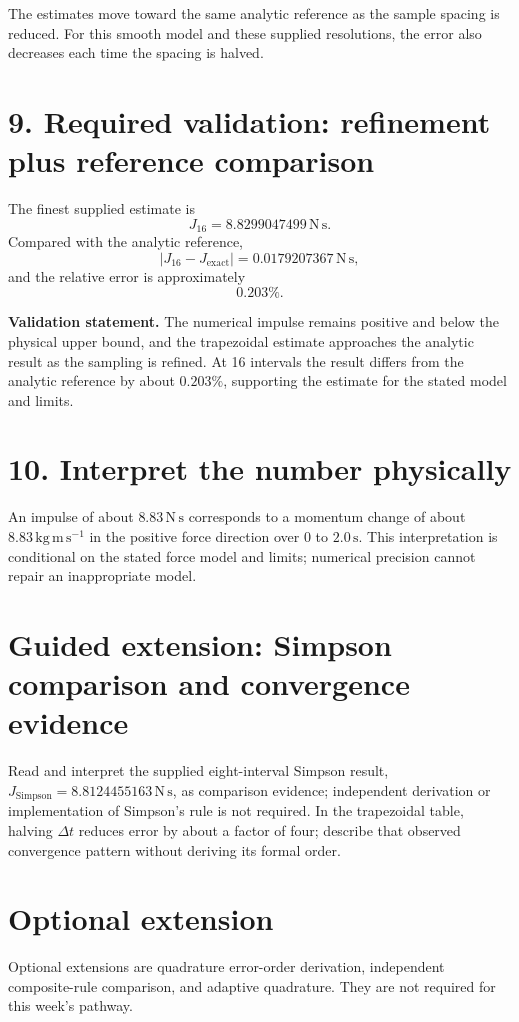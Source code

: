 \documentclass[11pt,a4paper]{article}
\newcommand{\units}[1]{\,\mathrm{#1}}
\begin{document}
The estimates move toward the same analytic reference as the sample spacing is reduced. For this smooth model and these supplied resolutions, the error also decreases each time the spacing is halved.

\section*{9. Required validation: refinement plus reference comparison}
The finest supplied estimate is
\[
J_{16}=8.8299047499\units{N\,s}.
\]
Compared with the analytic reference,
\[
\left|J_{16}-J_{\mathrm{exact}}\right|
=0.0179207367\units{N\,s},
\]
and the relative error is approximately
\[
0.203\%.
\]

\begin{checkbox}\textbf{Validation statement.} The numerical impulse remains positive and below the physical upper bound, and the trapezoidal estimate approaches the analytic result as the sampling is refined. At 16 intervals the result differs from the analytic reference by about $0.203\%$, supporting the estimate for the stated model and limits.\end{checkbox}

\section*{10. Interpret the number physically}
An impulse of about $8.83\units{N\,s}$ corresponds to a momentum change of about $8.83\units{kg\,m\,s^{-1}}$ in the positive force direction over $0$ to $2.0\units{s}$. This interpretation is conditional on the stated force model and limits; numerical precision cannot repair an inappropriate model.

\section*{Guided extension: Simpson comparison and convergence evidence}
Read and interpret the supplied eight-interval Simpson result, $J_{\mathrm{Simpson}}=8.8124455163\units{N\,s}$, as comparison evidence; independent derivation or implementation of Simpson's rule is not required. In the trapezoidal table, halving $\Delta t$ reduces error by about a factor of four; describe that observed convergence pattern without deriving its formal order.

\section*{Optional extension}
Optional extensions are quadrature error-order derivation, independent composite-rule comparison, and adaptive quadrature. They are not required for this week's pathway.
\end{document}
